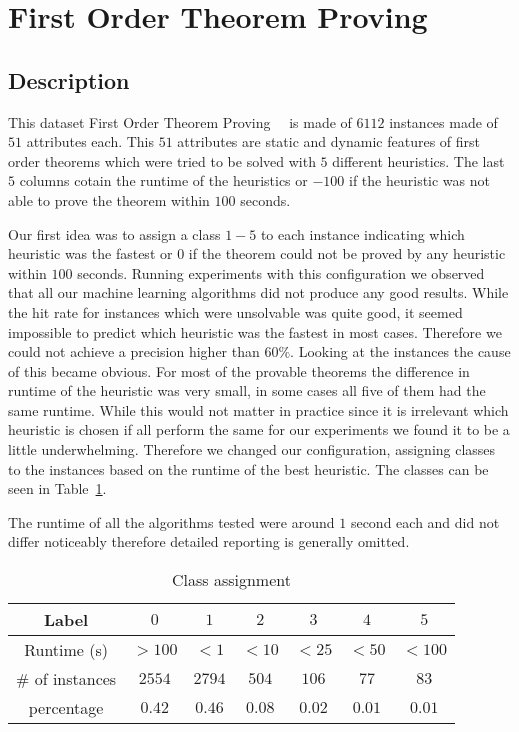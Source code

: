 \section{First Order Theorem Proving}
\label{db:sec:ds2}
\subsection{Description}
This dataset First Order Theorem Proving~\cite{ds2:uci}~\cite{ds2:paper} is made of $6112$ instances made of $51$ attributes each. This $51$ attributes are static and dynamic features of first order theorems which were tried to be solved with $5$ different heuristics. The last $5$ columns cotain the runtime of the heuristics or $-100$ if the heuristic was not able to prove the theorem within $100$ seconds.\par
Our first idea was to assign a class $1-5$ to each instance indicating which heuristic was the fastest or $0$ if the theorem could not be proved by any heuristic within $100$ seconds. Running experiments with this configuration we observed that all our machine learning algorithms did not produce any good results. While the hit rate for instances which were unsolvable was quite good, it seemed impossible to predict which heuristic was the fastest in most cases. Therefore we could not achieve a precision higher than $60\%$.
Looking at the instances the cause of this became obvious. For most of the provable theorems the difference in runtime of the heuristic was very small, in some cases all five of them had the same runtime. While this would not matter in practice since it is irrelevant which heuristic is chosen if all perform the same for our experiments we found it to be a little underwhelming. Therefore we changed our configuration, assigning classes to the instances based on the runtime of the best heuristic. The classes can be seen in Table~\ref{ds2:table:classes}.
\par The runtime of all the algorithms tested were around $1$ second each and did not differ noticeably therefore detailed reporting is generally omitted.
\begin{table}[h]
	\begin{center}
	\begin{tabular}{c|c|c|c|c|c|c}

		Label & $0$ & $1$ & $2$ & $3$ & $4$ & $5$\\\hline
		Runtime (s) & $>100$ & $<1$ & $<10$ & $<25$ & $<50$ &$<100$\\\hline
		$\#$ of instances & $2554$ & $2794$ & $504$ & $106$ & $77$ & $83$\\\hline
		percentage & $0.42$ & $0.46$ & $0.08$ & $0.02$ & $0.01$ & $0.01$\\\hline

	\end{tabular}
\end{center}
	\caption{Class assignment \label{ds2:table:classes}}
\end{table}
